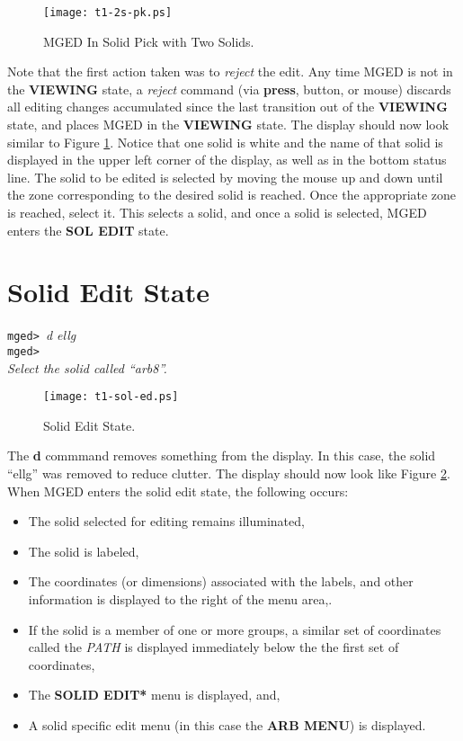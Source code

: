 \begin{figure}
\centering \texttt{[image: t1-2s-pk.ps]}
\caption{MGED In Solid Pick with Two Solids.}
\label{t1-2s-pk}
\end{figure}

Note that the first action taken was to {\sl reject} the edit.  Any time MGED
is not in the {\bf VIEWING} state, a {\sl reject} command (via
{\bf press}, button, or mouse) discards all editing changes accumulated
since the last transition out of the {\bf VIEWING} state, and places
MGED in the {\bf VIEWING} state.
The display should now look similar to Figure \ref{t1-2s-pk}.
Notice that one solid is white and
the name of that solid is displayed in the upper left corner of the
display, as well as in the bottom status line. The solid to be edited is
selected by moving the mouse up and down until the zone corresponding to
the desired solid is reached. Once the appropriate zone is reached, select it.
This selects a solid, and once a solid is selected,
MGED enters the {\bf SOL EDIT} state.

\section{Solid Edit State}

\noindent
{\tt mged> }{\em d ellg}\\
{\tt mged> }\\
{\em Select the solid called ``arb8''.}\\

\begin{figure}
\centering \texttt{[image: t1-sol-ed.ps]}
\caption{Solid Edit State.}
\label{t1-sol-ed}
\end{figure}

The {\bf d} commmand removes something from the display.  In this
case, the solid ``ellg'' was removed to reduce clutter.
The display should now look like Figure \ref{t1-sol-ed}.
When MGED enters the solid edit state, the following occurs:
\begin{itemize}
\item The solid selected for editing remains illuminated,
\item The solid is labeled,
\item The coordinates (or dimensions) associated with the labels,
and other information is displayed to the right of the menu area,.
\item If the solid is a member of one or more groups, a similar set
of coordinates called the {\sl PATH} is displayed immediately below
the the first set of coordinates,
\item The {\bf *SOLID EDIT*} menu is displayed, and,
\item A solid specific edit menu (in this case the {\bf ARB MENU})
is displayed.
\end{itemize}

